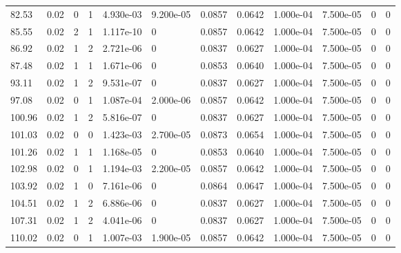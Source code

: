 \documentclass[preview]{standalone}
\begin{document}
{{\begin{tabular}{L{1.2cm}C{1.2cm} C{0.3cm}C{0.5cm} C{1.4cm}C{1.4cm} C{1.4cm}C{1.4cm} C{1.6cm}C{1.6cm} C{1.6cm}C{1.6cm}}
  82.53  &  0.02  & 0     &  1 &  4.930e-03  & 9.200e-05  &  0.0857&   0.0642& 1.000e-04 & 7.500e-05   &  0 & 0  \\ 
  85.55  &  0.02  & 2     &  1 &  1.117e-10  & 0  &  0.0857&   0.0642& 1.000e-04 & 7.500e-05   &  0 & 0  \\ 
  86.92  &  0.02  & 1     &  2 &  2.721e-06  & 0  &  0.0837&   0.0627& 1.000e-04 & 7.500e-05   &  0 & 0  \\ 
  87.48  &  0.02  & 1     &  1 &  1.671e-06  & 0  &  0.0853&   0.0640& 1.000e-04 & 7.500e-05   &  0 & 0  \\ 
  93.11  &  0.02  & 1     &  2 &  9.531e-07  & 0  &  0.0837&   0.0627& 1.000e-04 & 7.500e-05   &  0 & 0  \\ 
  97.08  &  0.02  & 0     &  1 &  1.087e-04  & 2.000e-06  &  0.0857&   0.0642& 1.000e-04 & 7.500e-05   &  0 & 0  \\ 
  100.96  &  0.02  & 1     &  2 &  5.816e-07  & 0  &  0.0837&   0.0627& 1.000e-04 & 7.500e-05   &  0 & 0  \\ 
  101.03  &  0.02  & 0     &  0 &  1.423e-03  & 2.700e-05  &  0.0873&   0.0654& 1.000e-04 & 7.500e-05   &  0 & 0  \\ 
  101.26  &  0.02  & 1     &  1 &  1.168e-05  & 0  &  0.0853&   0.0640& 1.000e-04 & 7.500e-05   &  0 & 0  \\ 
  102.98  &  0.02  & 0     &  1 &  1.194e-03  & 2.200e-05  &  0.0857&   0.0642& 1.000e-04 & 7.500e-05   &  0 & 0  \\ 
  103.92  &  0.02  & 1     &  0 &  7.161e-06  & 0  &  0.0864&   0.0647& 1.000e-04 & 7.500e-05   &  0 & 0  \\ 
  104.51  &  0.02  & 1     &  2 &  6.886e-06  & 0  &  0.0837&   0.0627& 1.000e-04 & 7.500e-05   &  0 & 0  \\ 
  107.31  &  0.02  & 1     &  2 &  4.041e-06  & 0  &  0.0837&   0.0627& 1.000e-04 & 7.500e-05   &  0 & 0  \\ 
  110.02  &  0.02  & 0     &  1 &  1.007e-03  & 1.900e-05  &  0.0857&   0.0642& 1.000e-04 & 7.500e-05   &  0 & 0  \\ 
\hline 
\end{tabular} 

}}
\end{document}
